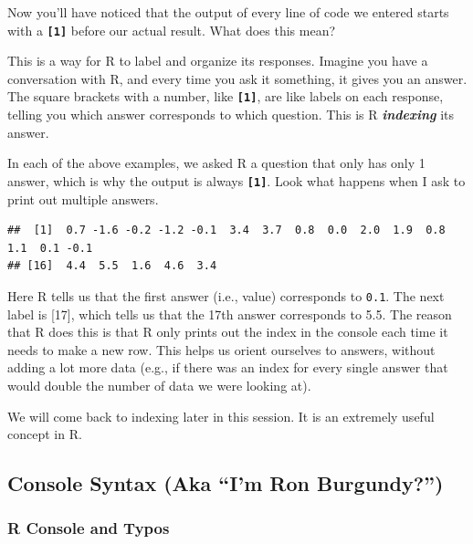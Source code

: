 \documentclass[
]{book}
\newenvironment{Shaded}{\begin{snugshade}}{\end{snugshade}}
\newcommand{\CommentTok}[1]{\textcolor[rgb]{0.56,0.35,0.01}{\textit{#1}}}
\newcommand{\FunctionTok}[1]{\textcolor[rgb]{0.13,0.29,0.53}{\textbf{#1}}}
\newcommand{\NormalTok}[1]{#1}
\newcommand{\SpecialCharTok}[1]{\textcolor[rgb]{0.81,0.36,0.00}{\textbf{#1}}}
\begin{document}
Now you'll have noticed that the output of every line of code we entered starts with a \textbf{\texttt{{[}1{]}}} before our actual result. What does this mean?

This is a way for R to label and organize its responses. Imagine you have a conversation with R, and every time you ask it something, it gives you an answer. The square brackets with a number, like \textbf{\texttt{{[}1{]}}}, are like labels on each response, telling you which answer corresponds to which question. This is R \textbf{\emph{indexing}} its answer.

In each of the above examples, we asked R a question that only has only 1 answer, which is why the output is always \textbf{\texttt{{[}1{]}}}. Look what happens when I ask to print out multiple answers.

\begin{Shaded}
\end{Shaded}

\begin{verbatim}
##  [1]  0.7 -1.6 -0.2 -1.2 -0.1  3.4  3.7  0.8  0.0  2.0  1.9  0.8  1.1  0.1 -0.1
## [16]  4.4  5.5  1.6  4.6  3.4
\end{verbatim}

Here R tells us that the first answer (i.e., value) corresponds to \texttt{0.1}. The next label is {[}17{]}, which tells us that the 17th answer corresponds to 5.5. The reason that R does this is that R only prints out the index in the console each time it needs to make a new row. This helps us orient ourselves to answers, without adding a lot more data (e.g., if there was an index for every single answer that would double the number of data we were looking at).

We will come back to indexing later in this session. It is an extremely useful concept in R.

\hypertarget{console-syntax-aka-im-ron-burgundy}{%
\subsection{Console Syntax (Aka ``I'm Ron Burgundy?'')}\label{console-syntax-aka-im-ron-burgundy}}

\hypertarget{r-console-and-typos}{%
\subsubsection{R Console and Typos}\label{r-console-and-typos}}
\end{document}
